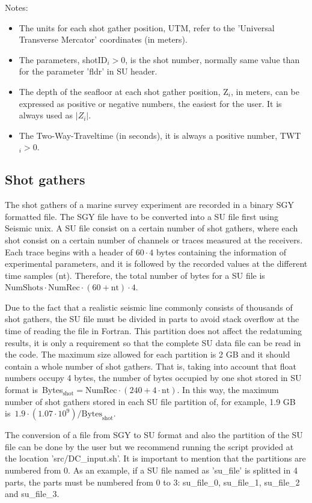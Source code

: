 \documentclass[11pt, oneside]{article}   	%
\begin{document}
Notes:
\begin{itemize}
\item The units for each shot gather position, UTM, refer to the  'Universal Transverse Mercator' coordinates (in meters).
\item The parameters, shotID$_i > 0$, is the shot number, normally same value than for the parameter 'fldr' in SU header.
\item The depth of the seafloor at each shot gather position, Z$_i$, in meters, can be expressed as positive or negative numbers, the easiest for the user. It is always used as $|Z_i|$.
\item The Two-Way-Traveltime (in seconds), it is always a positive number, TWT$_i > 0$.
\end{itemize}
\subsection{Shot gathers}\label{sec4c}

The shot gathers of a marine survey experiment are recorded in a binary SGY formatted file. The SGY file have to be converted into a SU file first using Seismic unix. A SU file consist on a certain number of shot gathers, where each shot consist on a certain number of channels or traces measured at the receivers. Each trace begins with a header of $60\cdot4$ bytes containing the information of experimental parameters, and it is followed by the recorded values at the different time samples (nt). Therefore, the total number of bytes for a SU file is~$\text{NumShots} \cdot \text{NumRec}\cdot (60+\text{nt}) \cdot 4$.

Due to the fact that a realistic seismic line commonly consists of thousands of shot gathers, the SU file must be divided in parts to avoid stack overflow at the time of reading the file in Fortran. This partition does not affect the redatuming results, it is only a requirement so that the complete SU data file can be read in the code.
The maximum size allowed for each partition is 2 GB and it should contain a whole number of shot gathers. That is, taking into account that float numbers occupy 4 bytes, the number of bytes occupied by one shot stored in SU format is~Bytes$_\text{shot}=\text{NumRec} \cdot \left(240+4 \cdot \text{nt}\right)$. In this way, the maximum number of shot gathers stored in each SU file partition of, for example, 1.9 GB is~${1.9 \cdot (1.07\cdot10^9)}/{\text{Bytes}_\text{shot}}$. 

The conversion of a file from SGY to SU format and also the partition of the SU file can be done by the user but we recommend running the script provided at the location 'src/DC\_input.sh'. It is important to mention that the partitions are numbered from 0. As an example, if a SU file named as 'su\_file' is splitted in 4 parts, the parts must be numbered from 0 to 3: su\_file\_0, su\_file\_1, su\_file\_2 and su\_file\_3.
\end{document}
